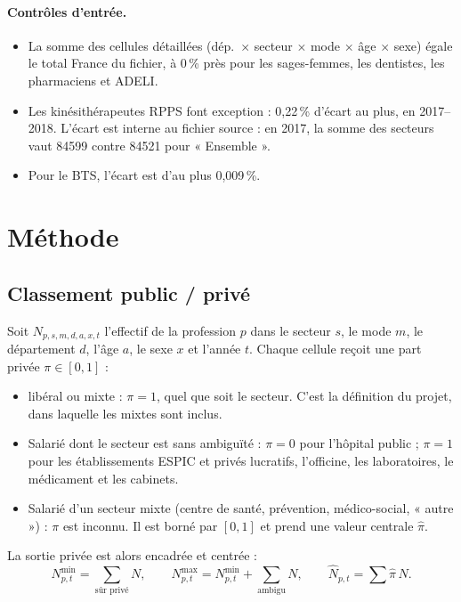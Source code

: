 \paragraph{Contrôles d'entrée.}
\begin{itemize}
  \item La somme des cellules détaillées (dép.~$\times$ secteur $\times$ mode $\times$ âge $\times$ sexe) égale
  le total France du fichier, à 0\,\% près\mesure{} pour les sages-femmes, les dentistes, les pharmaciens et
  ADELI.
  \item Les kinésithérapeutes RPPS font exception : 0,22\,\% d'écart au plus\mesure{}, en 2017--2018. L'écart est
  interne au fichier source : en 2017, la somme des secteurs vaut \num{84599} contre \num{84521} pour
  « Ensemble »\mesure{}.
  \item Pour le BTS, l'écart est d'au plus 0,009\,\%\mesure{}.
\end{itemize}

\section{Méthode}
\subsection{Classement public / privé}
Soit $N_{p,s,m,d,a,x,t}$ l'effectif de la profession $p$ dans le secteur $s$, le mode $m$, le département $d$,
l'âge $a$, le sexe $x$ et l'année $t$. Chaque cellule reçoit une part privée $\pi \in [0,1]$ :
\begin{itemize}
  \item libéral ou mixte : $\pi = 1$, quel que soit le secteur. C'est la définition du projet, dans laquelle
  les mixtes sont inclus.
  \item Salarié dont le secteur est sans ambiguïté : $\pi = 0$ pour l'hôpital public ; $\pi = 1$ pour les
  établissements ESPIC et privés lucratifs, l'officine, les laboratoires, le médicament et les cabinets.
  \item Salarié d'un secteur mixte (centre de santé, prévention, médico-social, « autre ») : $\pi$ est inconnu.
  Il est borné par $[0,1]$ et prend une valeur centrale $\hat\pi$.
\end{itemize}
La sortie privée est alors encadrée et centrée :
\begin{equation}
N^{\min}_{p,t} = \sum_{\text{sûr privé}} N, \qquad
N^{\max}_{p,t} = N^{\min}_{p,t} + \sum_{\text{ambigu}} N, \qquad
\hat N_{p,t} = \sum \hat\pi\, N .
\end{equation}

